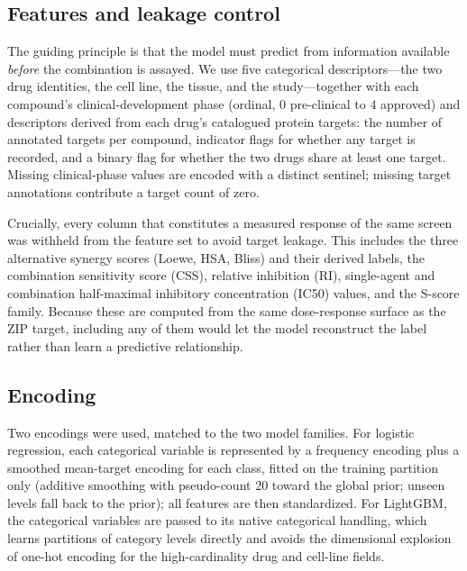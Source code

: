 \documentclass[11pt]{article}
\begin{document}
\subsection{Features and leakage control}
The guiding principle is that the model must predict from information available \emph{before} the
combination is assayed. We use five categorical descriptors---the two drug identities, the cell line,
the tissue, and the study---together with each compound's clinical-development phase (ordinal,
$0$ pre-clinical to $4$ approved) and descriptors derived from each drug's catalogued protein targets:
the number of annotated targets per compound, indicator flags for whether any target is recorded, and
a binary flag for whether the two drugs share at least one target. Missing clinical-phase values are
encoded with a distinct sentinel; missing target annotations contribute a target count of zero.

Crucially, every column that constitutes a measured response of the same screen was withheld from the
feature set to avoid target leakage. This includes the three alternative synergy scores (Loewe, HSA,
Bliss) and their derived labels, the combination sensitivity score (CSS), relative inhibition (RI),
single-agent and combination half-maximal inhibitory concentration (IC50) values, and the S-score
family. Because these are computed from the same dose-response surface as the ZIP target, including any
of them would let the model reconstruct the label rather than learn a predictive relationship.

\subsection{Encoding}
Two encodings were used, matched to the two model families. For logistic regression, each categorical
variable is represented by a frequency encoding plus a smoothed mean-target encoding for each class,
fitted on the training partition only (additive smoothing with pseudo-count $20$ toward the global
prior; unseen levels fall back to the prior); all features are then standardized. For LightGBM, the
categorical variables are passed to its native categorical handling, which learns partitions of
category levels directly and avoids the dimensional explosion of one-hot encoding for the
high-cardinality drug and cell-line fields.
\end{document}
